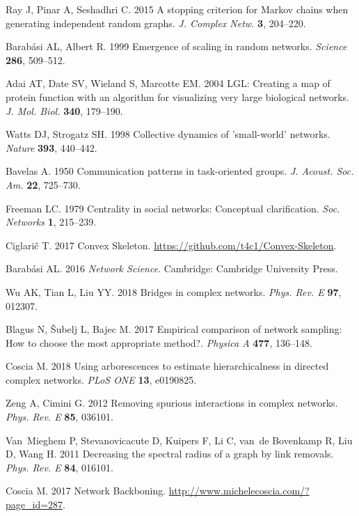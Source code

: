 \documentclass[]{rsif}
\begin{document}
\begin{thebibliography}{99}
Ray J, Pinar A, Seshadhri C. 2015  A stopping criterion for {Markov} chains
  when generating independent random graphs. {\em J. Complex Netw.} \textbf{3},
  204--220.

Barab{\'a}si AL, Albert R. 1999  Emergence of scaling in random networks. {\em
  Science} \textbf{286}, 509--512.

Adai AT, Date SV, Wieland S, Marcotte EM. 2004  {LGL}: {Creating} a map of
  protein function with an algorithm for visualizing very large biological
  networks. {\em J. Mol. Biol.} \textbf{340}, 179--190.

Watts DJ, Strogatz SH. 1998  Collective dynamics of 'small-world' networks.
  {\em Nature} \textbf{393}, 440--442.

Bavelas A. 1950  Communication patterns in task-oriented groups. {\em J.
  Acoust. Soc. Am.} \textbf{22}, 725--730.

Freeman LC. 1979  Centrality in social networks: {Conceptual} clarification.
  {\em Soc. Networks} \textbf{1}, 215--239.

Ciglari\v{c} T. 2017  {Convex} {Skeleton}.
  \url{https://github.com/t4c1/Convex-Skeleton}.

Barab{\'a}si AL. 2016 {\em Network {Science}}.
Cambridge: Cambridge University Press.

Wu AK, Tian L, Liu YY. 2018  Bridges in complex networks. {\em Phys. Rev. E}
  \textbf{97}, 012307.

Blagus N, {\v S}ubelj L, Bajec M. 2017  Empirical comparison of network
  sampling: {How} to choose the most appropriate method?. {\em Physica A}
  \textbf{477}, 136--148.

Coscia M. 2018  Using arborescences to estimate hierarchicalness in directed
  complex networks. {\em PLoS ONE} \textbf{13}, e0190825.

Zeng A, Cimini G. 2012  Removing spurious interactions in complex networks.
  {\em Phys. Rev. E} \textbf{85}, 036101.

Van~Mieghem P, Stevanovicacute D, Kuipers F, Li C, van~de Bovenkamp R, Liu D,
  Wang H. 2011  Decreasing the spectral radius of a graph by link removals.
  {\em Phys. Rev. E} \textbf{84}, 016101.

Coscia M. 2017  {Network} {Backboning}.
  \url{http://www.michelecoscia.com/?page_id=287}.


\end{thebibliography}
\end{document}
